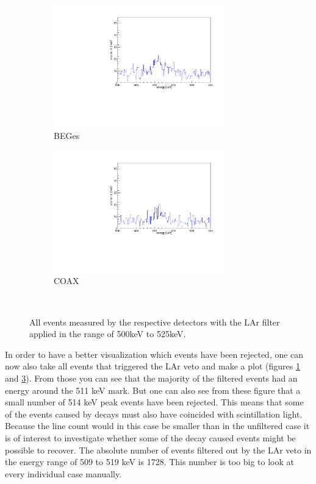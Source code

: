\documentclass[encoding=utf8,british]{tumphthesis}
\begin{document}
\begin{figure}[t!]
	\centering
	\begin{subfigure}{.5\textwidth}
		\includegraphics[width=75mm]{./Bilder/AntiLArBEGe.pdf}
		\caption{BEGes}
		\label{fig:AntiLArBEGes}
	\end{subfigure}%
	\begin{subfigure}{.5\textwidth}
		\includegraphics[width=75mm]{./Bilder/AntiLArCOAX.pdf}
		\caption{COAX}
		\label{fig:AntiLArCOAX}
	\end{subfigure}
	\\
	\vspace{0.5cm}
	\caption{All events measured by the respective detectors with the LAr filter applied in the range of 500keV to 525keV.}
\end{figure}

In order to have a better visualization which events have been rejected, one can now also take all events that triggered the LAr veto and make a plot (figures \ref{fig:AntiLArBEGes} and \ref{fig:AntiLArCOAX}).
From those you can see that the majority of the filtered events had an energy around the 511 keV mark.
But one can also see from these figure that a small number of 514 keV peak events have been rejected.
This means that some of the events caused by \Kr decays must also have coincided with scintillation light.
\\

Because the line count would in this case be smaller than in the unfiltered case it is of interest to investigate whether some of the \Kr decay caused events might be possible to recover.
The absolute number of events filtered out by the LAr veto in the energy range of 509 to 519 keV is 1728.
This number is too big to look at every individual case manually.
\\
\end{document}
